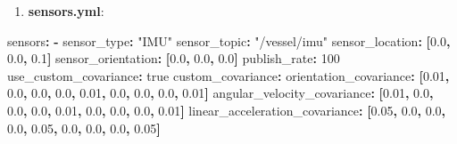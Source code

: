 \documentclass[
  letterpaper,
  DIV=11,
  numbers=noendperiod]{scrreprt}
\newenvironment{Shaded}{\begin{snugshade}}{\end{snugshade}}
\newcommand{\AttributeTok}[1]{\textcolor[rgb]{0.40,0.45,0.13}{#1}}
\newcommand{\CharTok}[1]{\textcolor[rgb]{0.13,0.47,0.30}{#1}}
\newcommand{\DecValTok}[1]{\textcolor[rgb]{0.68,0.00,0.00}{#1}}
\newcommand{\FloatTok}[1]{\textcolor[rgb]{0.68,0.00,0.00}{#1}}
\newcommand{\FunctionTok}[1]{\textcolor[rgb]{0.28,0.35,0.67}{#1}}
\newcommand{\KeywordTok}[1]{\textcolor[rgb]{0.00,0.23,0.31}{\textbf{#1}}}
\newcommand{\StringTok}[1]{\textcolor[rgb]{0.13,0.47,0.30}{#1}}
\providecommand{\tightlist}{%
  \setlength{\itemsep}{0pt}\setlength{\parskip}{0pt}}\usepackage{longtable,booktabs,array}
\begin{document}
\begin{enumerate}
\def\labelenumi{\arabic{enumi}.}
\setcounter{enumi}{7}
\tightlist
\item
  \textbf{sensors.yml}:
\end{enumerate}

\begin{Shaded}
\begin{Highlighting}[]
\FunctionTok{sensors}\KeywordTok{:}
\AttributeTok{  }\KeywordTok{{-}}\AttributeTok{ }\FunctionTok{sensor\_type}\KeywordTok{:}\AttributeTok{ }\StringTok{"IMU"}
\AttributeTok{    }\FunctionTok{sensor\_topic}\KeywordTok{:}\AttributeTok{ }\StringTok{"/vessel/imu"}
\AttributeTok{    }\FunctionTok{sensor\_location}\KeywordTok{:}\AttributeTok{ }\KeywordTok{[}\FloatTok{0.0}\KeywordTok{,}\AttributeTok{ }\FloatTok{0.0}\KeywordTok{,}\AttributeTok{ }\FloatTok{0.1}\KeywordTok{]}
\AttributeTok{    }\FunctionTok{sensor\_orientation}\KeywordTok{:}\AttributeTok{ }\KeywordTok{[}\FloatTok{0.0}\KeywordTok{,}\AttributeTok{ }\FloatTok{0.0}\KeywordTok{,}\AttributeTok{ }\FloatTok{0.0}\KeywordTok{]}
\AttributeTok{    }\FunctionTok{publish\_rate}\KeywordTok{:}\AttributeTok{ }\DecValTok{100}
\AttributeTok{    }\FunctionTok{use\_custom\_covariance}\KeywordTok{:}\AttributeTok{ }\CharTok{true}
\AttributeTok{    }\FunctionTok{custom\_covariance}\KeywordTok{:}
\AttributeTok{      }\FunctionTok{orientation\_covariance}\KeywordTok{:}\AttributeTok{ }\KeywordTok{[}\FloatTok{0.01}\KeywordTok{,}\AttributeTok{ }\FloatTok{0.0}\KeywordTok{,}\AttributeTok{ }\FloatTok{0.0}\KeywordTok{,}\AttributeTok{ }\FloatTok{0.0}\KeywordTok{,}\AttributeTok{ }\FloatTok{0.01}\KeywordTok{,}\AttributeTok{ }\FloatTok{0.0}\KeywordTok{,}\AttributeTok{ }\FloatTok{0.0}\KeywordTok{,}\AttributeTok{ }\FloatTok{0.0}\KeywordTok{,}\AttributeTok{ }\FloatTok{0.01}\KeywordTok{]}
\AttributeTok{      }\FunctionTok{angular\_velocity\_covariance}\KeywordTok{:}\AttributeTok{ }\KeywordTok{[}\FloatTok{0.01}\KeywordTok{,}\AttributeTok{ }\FloatTok{0.0}\KeywordTok{,}\AttributeTok{ }\FloatTok{0.0}\KeywordTok{,}\AttributeTok{ }\FloatTok{0.0}\KeywordTok{,}\AttributeTok{ }\FloatTok{0.01}\KeywordTok{,}\AttributeTok{ }\FloatTok{0.0}\KeywordTok{,}\AttributeTok{ }\FloatTok{0.0}\KeywordTok{,}\AttributeTok{ }\FloatTok{0.0}\KeywordTok{,}\AttributeTok{ }\FloatTok{0.01}\KeywordTok{]}
\AttributeTok{      }\FunctionTok{linear\_acceleration\_covariance}\KeywordTok{:}\AttributeTok{ }\KeywordTok{[}\FloatTok{0.05}\KeywordTok{,}\AttributeTok{ }\FloatTok{0.0}\KeywordTok{,}\AttributeTok{ }\FloatTok{0.0}\KeywordTok{,}\AttributeTok{ }\FloatTok{0.0}\KeywordTok{,}\AttributeTok{ }\FloatTok{0.05}\KeywordTok{,}\AttributeTok{ }\FloatTok{0.0}\KeywordTok{,}\AttributeTok{ }\FloatTok{0.0}\KeywordTok{,}\AttributeTok{ }\FloatTok{0.0}\KeywordTok{,}\AttributeTok{ }\FloatTok{0.05}\KeywordTok{]}
\end{Highlighting}
\end{Shaded}
\end{document}

